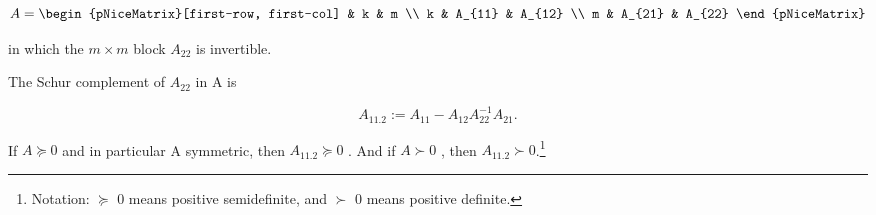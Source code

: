 \[
A =
\begin{pNiceMatrix}[first-row, first-col]
      & k & m \\
k & A_{11} & A_{12} \\
m & A_{21} & A_{22}
\end{pNiceMatrix}
\]

in which the \(m \times m\) block \(A_{22}\) is invertible.

\begin{definition}
    \label{def:schur}
The Schur complement of \(A_{22}\) in A is

\[A_{11.2} := A_{11} - A_{12}A_{22}^{-1}A_{21}.\]
\end{definition}

\begin{lemma}
If \(A \succeq 0\) and in particular A symmetric,
then \(A_{11.2} \succeq 0\) . And if \(A \succ 0\) , then
\(A_{11.2} \succ 0\).\footnote{Notation: \(\succeq \) 0 means positive semidefinite,
and \(\succ\) 0 means positive definite.}
\end{lemma}


